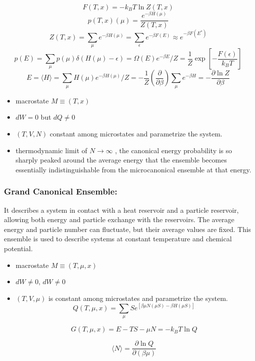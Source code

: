 \documentclass{article}
\begin{document}
$$F(T, x) = -k_BT \ln Z(T, x)$$
$$p(T, x)(\mu) = \frac{e^{-\beta H(\mu)}}{Z(T, x)}$$
$$Z(T, x) = \sum_{\mu} e^{-\beta H(\mu)} = \sum_{\epsilon} e^{-\beta F(E)} \approx e^{-\beta F(E^*)}$$
$$p(E) = \sum_{\mu} p(\mu) \delta(H(\mu) - \epsilon) = \Omega(E) e^{-\beta E}/Z = \frac{1}{Z}\exp\left[-\frac{F(\epsilon)}{k_BT}\right]
$$
$$E = \langle H \rangle = \sum_{\mu} H(\mu)e^{-\beta H(\mu)}/Z = -\frac{1}{Z}\left(\frac{\partial}{\partial\beta}\right)\sum_{\mu} e^{-\beta H} =-\frac{\partial \ln Z}{\partial \beta}$$
\begin{itemize}
    \item macrostate $M \equiv (T, x)
$
\item $dW = 0$ but
$dQ \neq 0$
\item $(T,V,N)$ constant among microstates and parametrize the system.
\item thermodynamic limit of $N \rightarrow \infty$
, the canonical energy probability is so sharply peaked around the average energy that
the ensemble becomes essentially indistinguishable from the microcanonical ensemble at that energy.


\end{itemize}




\subsubsection{Grand Canonical Ensemble:} It describes a system in contact with a heat reservoir and a particle reservoir, allowing both energy and particle exchange with the reservoirs. The average energy and particle number can fluctuate, but their average values are fixed. This ensemble is used to describe systems at constant temperature and chemical potential.
\begin{itemize}
    \item macrostate $M \equiv (T, \mu, x)
$
\item $dW \neq 0$, $dW \neq 0$


\item $(T, V, \mu)$ is constant among microstates and parametrize the system.
$$Q(T, \mu, x) = \sum_{\mu}S e^{\left[\beta\mu N(\mu S)-\beta H(\mu S)\right]}$$

$$G(T, \mu, x) = E - TS - \mu N = -k_BT \ln Q$$

$$\langle N \rangle = \frac{\partial \ln Q}{\partial (\beta\mu)}$$



\end{itemize}
\end{document}
